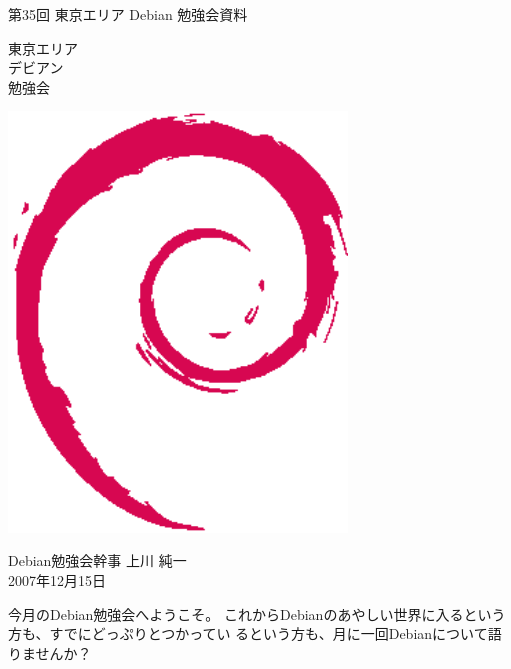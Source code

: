 \documentclass[mingoth,a4paper]{jsarticle}
\newcommand{\debmtgyear}{2007}
\newcommand{\debmtgdate}{15}
\newcommand{\debmtgmonth}{12}
\newcommand{\debmtgnumber}{35}
\begin{document}
\begin{titlepage}



 第\debmtgnumber{}回 東京エリア Debian 勉強会資料

\vspace{2cm}

\begin{minipage}[t]{0.6\hsize}
\vspace{-2cm}
{\fontsize{60}{60}
{\gt
東京エリア \\
デビアン \\
勉強会
}}
\end{minipage}
\begin{minipage}[b]{0.4\hsize}
\hspace{-1cm}\includegraphics[width=9cm]{image200502/openlogo-nd.eps}
\end{minipage}

\vspace{3cm}
\hfill{}Debian勉強会幹事 上川 純一\\
\hfill{}\debmtgyear{}年\debmtgmonth{}月\debmtgdate{}日

\thispagestyle{empty}
\end{titlepage}

 
 今月のDebian勉強会へようこそ。
 これからDebianのあやしい世界に入るという方も、すでにどっぷりとつかってい
 るという方も、月に一回Debianについて語りませんか？
\end{document}
